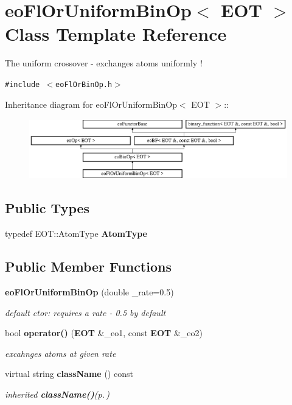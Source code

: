 \section{eo\-Fl\-Or\-Uniform\-Bin\-Op$<$ EOT $>$ Class Template Reference}
\label{classeo_fl_or_uniform_bin_op}
The uniform crossover - exchanges atoms uniformly !  


{\tt \#include $<$eo\-Fl\-Or\-Bin\-Op.h$>$}

Inheritance diagram for eo\-Fl\-Or\-Uniform\-Bin\-Op$<$ EOT $>$::\begin{figure}[H]
\begin{center}
\leavevmode
\includegraphics[height=2.60163cm]{classeo_fl_or_uniform_bin_op}
\end{center}
\end{figure}
\subsection*{Public Types}
\begin{CompactItemize}
\item 
typedef EOT::Atom\-Type {\bf Atom\-Type}\label{classeo_fl_or_uniform_bin_op_w0}

\end{CompactItemize}
\subsection*{Public Member Functions}
\begin{CompactItemize}
\item 
{\bf eo\-Fl\-Or\-Uniform\-Bin\-Op} (double \_\-rate=0.5)\label{classeo_fl_or_uniform_bin_op_a0}

\begin{CompactList}\small\item\em default ctor: requires a rate - 0.5 by default \item\end{CompactList}\item 
bool {\bf operator()} ({\bf EOT} \&\_\-eo1, const {\bf EOT} \&\_\-eo2)\label{classeo_fl_or_uniform_bin_op_a1}

\begin{CompactList}\small\item\em excahnges atoms at given rate \item\end{CompactList}\item 
virtual string {\bf class\-Name} () const \label{classeo_fl_or_uniform_bin_op_a2}

\begin{CompactList}\small\item\em inherited {\bf class\-Name()}{\rm (p.\,\pageref{classeo_fl_or_uniform_bin_op_a2})} \item\end{CompactList}\end{CompactItemize}
